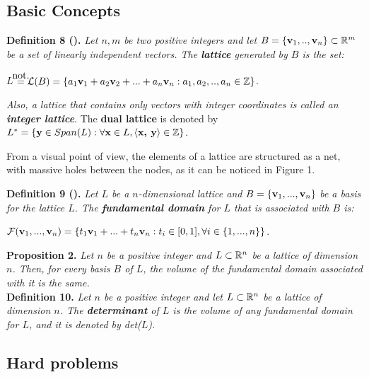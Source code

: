 \subsection{Basic Concepts}

\textbf{Definition 8 (\cite{HPS08}).} \textit{Let $n, m$ be two positive integers and let} $B = \{\textbf{v}_1, .., \textbf{v}_n\} \subset \mathbb{R}^m$ \textit{ be a set of linearly independent vectors. The \textbf{lattice} generated by $B$ is the set:}
\begin{center}
	$L$   $  \stackrel{\mathclap{\normalfont\mbox{not.}}}{=} \mathcal{L}(B) = \{a_1\vv_1 + a_2 \vv_2 +... + a_n\vv_n : a_1, a_2, ..,a_n \in \bZ\}$.
\end{center}

\textit{Also, a lattice that contains only vectors with integer coordinates is called an \textbf{integer lattice}}. The \textbf{dual lattice} is denoted by $L^* = \{\textbf{y} \in Span(L) : \forall \textbf{x} \in L, \langle\textbf{x, y}\rangle \in {\mathbb Z}\}$.


From a visual point of view, the elements of a lattice are structured as a net, with massive holes between the nodes, as it can be noticed in Figure 1.

\textbf{Definition 9 (\cite{HPS08}).} \textit{Let $L$ be a $n$-dimensional lattice and} $B = \{\textbf{v}_1,...,\textbf{v}_n\}$ \textit{be a basis for the lattice $L$. The \textbf{fundamental domain} for $L$ that is associated with $B$ is:}
\begin{center}
	$\mathcal{F}(\textbf{v}_1,...,\textbf{v}_n) = \{t_1\textbf{v}_1 + ...+ t_n\textbf{v}_n : t_i \in [0, 1], \forall i \in \{1,..., n\}\}$.
\end{center}


\begin{center}
	
\end{center}

\textbf{Proposition 2.} \textit{Let $n$ be a positive integer and $L \subset \mathbb{R}^n$ be a lattice of dimension $n$. Then, for every basis $B$ of $L$, the volume of the fundamental domain associated with it is the same.}\\

\textbf{Definition 10.} \textit{Let $n$ be a positive integer and let $L \subset \mathbb{R}^n$ be a lattice of dimension $n$. The \textbf{determinant} of $L$ is the volume of any fundamental domain for $L$, and it is denoted by det($L$).}

\subsection{Hard problems}

